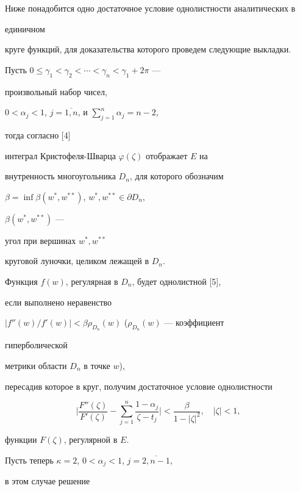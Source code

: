 Ниже понадобится одно достаточное условие однолистности аналитических в 


единичном


круге функций, для доказательства которого проведем следующие выкладки.


Пусть $0\le\gamma_1<\gamma_2<\dotsb<\gamma_n<\gamma_1+2\pi$ ---


произвольный набор чисел,


$0<\alpha_j<1$, $j=\overline{1,n}$, и $\sum\limits_{j=1}^{n}\alpha_j=n-2$,


тогда согласно [4]


интеграл Кристофеля-Шварца $\varphi(\zeta)$ отображает $E$ на


внутренность многоугольника $D_n$, для которого обозначим


$\beta=\inf\beta(w^{*}, w^{**})$, $w^{*}, w^{**}\in\partial D_n$,


$\beta(w^{*},w^{**})$ ---


угол при вершинах $w^{*},w^{**}$


круговой луночки, целиком лежащей в $D_n$.





Функция $f(w)$, регулярная в $D_n$, будет однолистной [5],


если выполнено неравенство\linebreak


$|f''(w)/f'(w)|<\beta\rho_{D_n}(w)$ ($\rho_{D_n}(w)$ --- коэффициент


гиперболической


метрики области $D_n$ в точке $w$),


пересадив которое в круг, получим достаточное условие однолистности


\begin{equation}


\biggl|\frac{F''(\zeta)}{F'(\zeta)}-


\sum_{j=1}^{n}\frac{1-\alpha_j}{\zeta -t_j}\biggr|<


\frac{\beta}{1-|\zeta|^2},\quad |\zeta|<1,


\end{equation}


функции $F(\zeta)$, регулярной в $E$.





Пусть теперь $\kappa=2$, $0<\alpha_j<1$, $j=\overline{2,n-1}$, 


в этом случае решение


